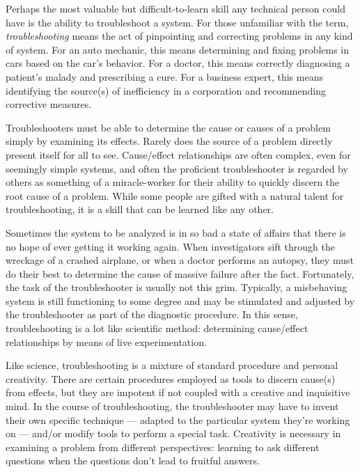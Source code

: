 \startchapter[title={Theory And Practice}]

\startsection[title={Troubleshooting}]

Perhaps the most valuable but difficult-to-learn skill any technical
person could have is the ability to troubleshoot a system. For those
unfamiliar with the term, {\em troubleshooting} means the act of
pinpointing and correcting problems in any kind of system. For an auto
mechanic, this means determining and fixing problems in cars based on
the car's behavior. For a doctor, this means correctly diagnosing a
patient's malady and prescribing a cure. For a business expert, this
means identifying the source(s) of inefficiency in a corporation and
recommending corrective measures.

Troubleshooters must be able to determine the cause or causes of a
problem simply by examining its effects. Rarely does the source of a
problem directly present itself for all to see. Cause/effect
relationships are often complex, even for seemingly simple systems, and
often the proficient troubleshooter is regarded by others as something
of a miracle-worker for their ability to quickly discern the root cause
of a problem. While some people are gifted with a natural talent for
troubleshooting, it is a skill that can be learned like any other.

Sometimes the system to be analyzed is in so bad a state of affairs that
there is no hope of ever getting it working again. When investigators
sift through the wreckage of a crashed airplane, or when a doctor
performs an autopsy, they must do their best to determine the cause of
massive failure after the fact. Fortunately, the task of the
troubleshooter is usually not this grim. Typically, a misbehaving system
is still functioning to some degree and may be stimulated and adjusted
by the troubleshooter as part of the diagnostic procedure. In this
sense, troubleshooting is a lot like scientific method: determining
cause/effect relationships by means of live experimentation.

Like science, troubleshooting is a mixture of standard procedure and
personal creativity. There are certain procedures employed as tools to
discern cause(s) from effects, but they are impotent if not coupled with
a creative and inquisitive mind. In the course of troubleshooting, the
troubleshooter may have to invent their own specific technique ---
adapted to the particular system they're working on --- and/or modify
tools to perform a special task. Creativity is necessary in examining a
problem from different perspectives: learning to ask different questions
when the  questions don't lead to fruitful answers.

